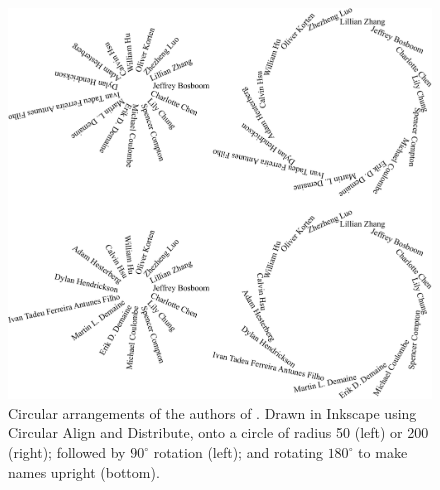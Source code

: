 \documentclass[natbib,authoryear]{sigtbd17-style}
\begin{document}
\begin{figure}
  \centering
  \includegraphics[width=\linewidth]{figs/circles}
  \caption{Circular arrangements of the authors of
    \citet{LessThanEdgeMatching_JIP}.  Drawn in Inkscape
    using Circular Align and Distribute, onto a circle of
    radius 50 (left) or 200 (right); followed by $90^\circ$ rotation
    (left); and rotating $180^\circ$ to make names upright (bottom).}
  \label{fig:circles}
\end{figure}



%
\end{document}
